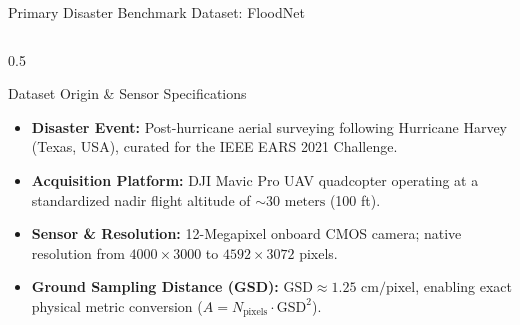 \documentclass[aspectratio=169, 10pt, professionalfonts]{beamer}
\begin{document}
\begin{frame}{Primary Disaster Benchmark Dataset: FloodNet}
  \begin{columns}[T]
    \begin{column}{0.5\textwidth}
      \begin{block}{Dataset Origin \& Sensor Specifications}
        \begin{itemize}\setlength{\itemsep}{0.4em}\footnotesize
          \item \textbf{Disaster Event:} Post-hurricane aerial surveying following Hurricane Harvey (Texas, USA), curated for the IEEE EARS 2021 Challenge.
          \item \textbf{Acquisition Platform:} DJI Mavic Pro UAV quadcopter operating at a standardized nadir flight altitude of $\sim 30\text{ meters}$ (100 ft).
          \item \textbf{Sensor \& Resolution:} 12-Megapixel onboard CMOS camera; native resolution from $4000\times3000$ to $4592\times3072$ pixels.
          \item \textbf{Ground Sampling Distance (GSD):} $\text{GSD} \approx 1.25\text{ cm/pixel}$, enabling exact physical metric conversion ($A = N_{\text{pixels}} \cdot \text{GSD}^2$).
        \end{itemize}
      \end{block}
    \end{column}
    

\end{columns}
\end{frame}
\end{document}
